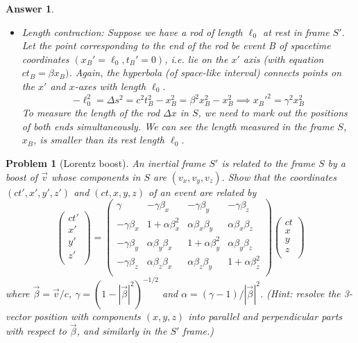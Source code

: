 \documentclass[a4paper]{article}
\theoremstyle{new2}
\newtheorem{ans}{Answer}[section]
\theoremstyle{new}
\newtheorem{qns}{Problem}[section]
\begin{document}
\begin{ans}
\begin{enumerate}[label=(\alph*)]
\begin{itemize}
    $$c^2T_0^2=\Delta s^2=c^2t_A^2-x_A^2=c^2t_A^2(1-\beta^2)\implies T_0^2=\frac{t_A^2}{\gamma^2}$$
    To measure the period in $S$, we need to measure the time between two marked events at the same place. We can see that the time elapsed in frame $S$, $t_A$ is longer than the time elapsed in the clock's own rest frame $T_0$.
    \item Length contraction: Suppose we have a rod of length $\ell_0$ at rest in frame $S'$. Let the point corresponding to the end of the rod be event B of spacetime coordinates $(x_B'=\ell_0,t_B'=0)$, i.e. lie on the $x'$ axis (with equation $ct_B=\beta x_B)$. Again, the hyperbola (of space-like interval) connects points on the $x'$ and $x$-axes with length $\ell_0$.
    $$-\ell_0^2=\Delta s^2=c^2t_B^2-x_B^2=\beta^2x_B^2-x_B^2\implies x_B'^2=\gamma^2x_B^2$$
    To measure the length of the rod $\Delta x$ in $S$, we need to mark out the positions of both ends simultaneously. We can see the length measured in the frame $S$, $x_B$, is smaller than its rest length $\ell_0$.
\end{itemize}
\end{enumerate}
\end{ans}
\begin{qns}[Lorentz boost]
An inertial frame $S'$ is related to the frame $S$ by a boost of $\vec{v}$ whose components in $S$ are $(v_x, v_y, v_z)$. Show that the coordinates $(ct', x', y', z')$ and $(ct, x, y, z)$ of an event are related by
$$\begin{pmatrix}ct'\\x'\\y'\\z'\\\end{pmatrix}=\begin{pmatrix}\gamma&-\gamma\beta_x&-\gamma\beta_y&-\gamma\beta_z\\-\gamma\beta_x&1+\alpha\beta_x^2&\alpha\beta_x\beta_y&\alpha\beta_x\beta_z\\-\gamma\beta_y&\alpha\beta_y\beta_x&1+\alpha\beta_y^2&\alpha\beta_y\beta_z\\-\gamma\beta_z&\alpha\beta_z\beta_x&\alpha\beta_z\beta_y&1+\alpha\beta_z^2\\\end{pmatrix}\begin{pmatrix}ct\\x\\y\\z\\\end{pmatrix}$$
where $\vec{\beta}=\vec{v}/c$, $\gamma=(1-|\vec{\beta}|^2)^{-1/2}$ and $\alpha=(\gamma-1)/|\vec{\beta}|^2$. (Hint: resolve the 3-vector position with components $(x, y, z)$ into parallel and perpendicular parts with respect to $\vec{\beta}$, and similarly in the $S'$ frame.)
\end{qns}
\end{document}
